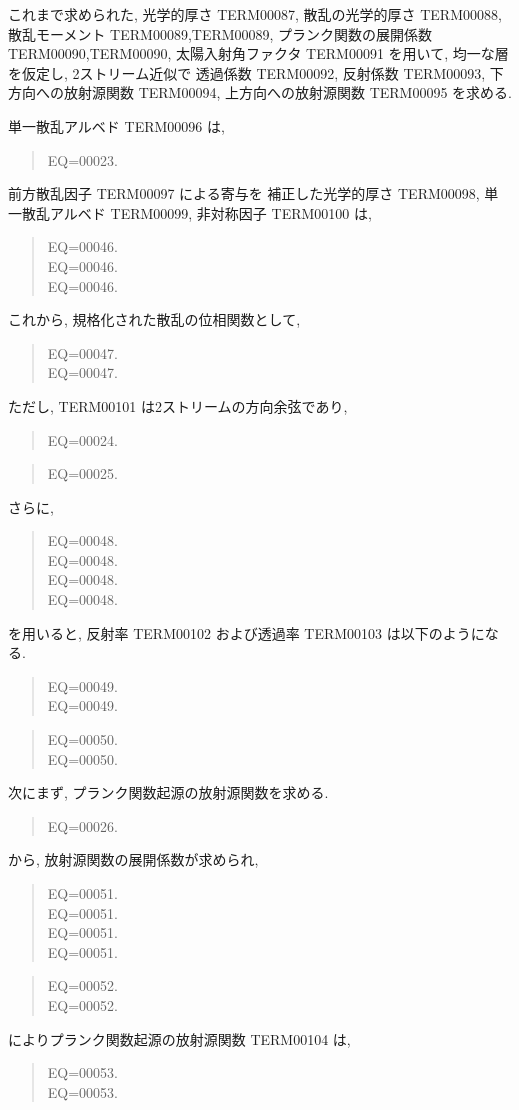 これまで求められた, 光学的厚さ TERM00087, 散乱の光学的厚さ TERM00088,
散乱モーメント TERM00089,TERM00089, プランク関数の展開係数 TERM00090,TERM00090,
太陽入射角ファクタ TERM00091 を用いて,
均一な層を仮定し, 2ストリーム近似で
透過係数 TERM00092, 反射係数 TERM00093, 下方向への放射源関数 TERM00094,
上方向への放射源関数 TERM00095 を求める.

単一散乱アルベド TERM00096 は,
\begin{quote}
EQ=00023.
\end{quote}
前方散乱因子 TERM00097 による寄与を
補正した光学的厚さ TERM00098,
単一散乱アルベド TERM00099, 非対称因子 TERM00100 は,
\begin{quote}
EQ=00046.\\
EQ=00046.\\
EQ=00046.
\end{quote}

これから, 規格化された散乱の位相関数として,
\begin{quote}
EQ=00047.\\
EQ=00047.
\end{quote}
ただし, TERM00101 は2ストリームの方向余弦であり,
\begin{quote}
EQ=00024.
\end{quote}
\begin{quote}
EQ=00025.
\end{quote}

さらに,
\begin{quote}
EQ=00048.\\
EQ=00048.\\
EQ=00048.\\
EQ=00048.
\end{quote}
を用いると, 反射率 TERM00102 および透過率 TERM00103 は以下のようになる.
\begin{quote}
EQ=00049.\\
EQ=00049.
\end{quote}
\begin{quote}
EQ=00050.\\
EQ=00050.
\end{quote}

次にまず, プランク関数起源の放射源関数を求める.
\begin{quote}
EQ=00026.
\end{quote}
から, 放射源関数の展開係数が求められ,
\begin{quote}
EQ=00051.\\
EQ=00051.\\
EQ=00051.\\
EQ=00051.
\end{quote}
\begin{quote}
EQ=00052.\\
EQ=00052.
\end{quote}
によりプランク関数起源の放射源関数 TERM00104 は,
\begin{quote}
EQ=00053.\\
EQ=00053.
\end{quote}

